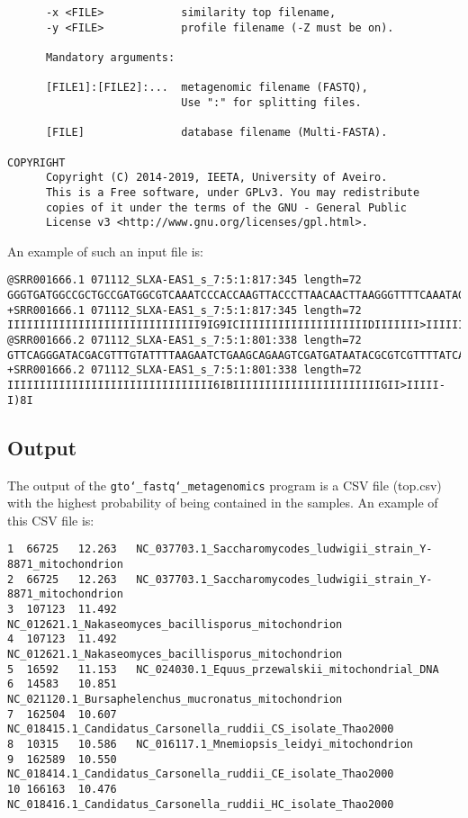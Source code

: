 \begin{lstlisting}
      -x <FILE>            similarity top filename,                      
      -y <FILE>            profile filename (-Z must be on).             
                                                                         
      Mandatory arguments:                                               
                                                                         
      [FILE1]:[FILE2]:...  metagenomic filename (FASTQ),                 
                           Use ":" for splitting files.                
                                                                         
      [FILE]               database filename (Multi-FASTA).              
                                                                         
COPYRIGHT                                                                
      Copyright (C) 2014-2019, IEETA, University of Aveiro.              
      This is a Free software, under GPLv3. You may redistribute         
      copies of it under the terms of the GNU - General Public           
      License v3 <http://www.gnu.org/licenses/gpl.html>.    
\end{lstlisting}
An example of such an input file is:
\begin{lstlisting}
@SRR001666.1 071112_SLXA-EAS1_s_7:5:1:817:345 length=72
GGGTGATGGCCGCTGCCGATGGCGTCAAATCCCACCAAGTTACCCTTAACAACTTAAGGGTTTTCAAATAGA
+SRR001666.1 071112_SLXA-EAS1_s_7:5:1:817:345 length=72
IIIIIIIIIIIIIIIIIIIIIIIIIIIIII9IG9ICIIIIIIIIIIIIIIIIIIIIDIIIIIII>IIIIII/
@SRR001666.2 071112_SLXA-EAS1_s_7:5:1:801:338 length=72
GTTCAGGGATACGACGTTTGTATTTTAAGAATCTGAAGCAGAAGTCGATGATAATACGCGTCGTTTTATCAT
+SRR001666.2 071112_SLXA-EAS1_s_7:5:1:801:338 length=72
IIIIIIIIIIIIIIIIIIIIIIIIIIIIIIII6IBIIIIIIIIIIIIIIIIIIIIIIIGII>IIIII-I)8I
\end{lstlisting}

\subsection*{Output}

The output of the \texttt{gto\char`_fastq\char`_metagenomics} program is a CSV file (top.csv) with the highest probability of being contained in the samples. An example of this CSV file is:

\begin{lstlisting}
1  66725   12.263   NC_037703.1_Saccharomycodes_ludwigii_strain_Y-8871_mitochondrion
2  66725   12.263   NC_037703.1_Saccharomycodes_ludwigii_strain_Y-8871_mitochondrion
3  107123  11.492   NC_012621.1_Nakaseomyces_bacillisporus_mitochondrion
4  107123  11.492   NC_012621.1_Nakaseomyces_bacillisporus_mitochondrion
5  16592   11.153   NC_024030.1_Equus_przewalskii_mitochondrial_DNA
6  14583   10.851   NC_021120.1_Bursaphelenchus_mucronatus_mitochondrion
7  162504  10.607   NC_018415.1_Candidatus_Carsonella_ruddii_CS_isolate_Thao2000
8  10315   10.586   NC_016117.1_Mnemiopsis_leidyi_mitochondrion
9  162589  10.550   NC_018414.1_Candidatus_Carsonella_ruddii_CE_isolate_Thao2000
10 166163  10.476   NC_018416.1_Candidatus_Carsonella_ruddii_HC_isolate_Thao2000
\end{lstlisting}
